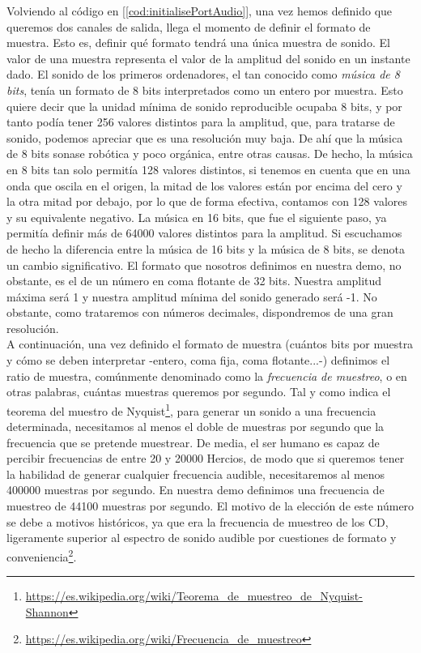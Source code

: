 Volviendo al código en [\ref{cod:initialisePortAudio}], una vez hemos definido que queremos dos canales de salida, llega el momento de definir el formato de muestra. Esto es, definir qué formato tendrá una única muestra de sonido. El valor de una muestra representa el valor de la amplitud del sonido en un instante dado. El sonido de los primeros ordenadores, el tan conocido como \emph{música de 8 bits}, tenía un formato de 8 bits interpretados como un entero por muestra. Esto quiere decir que la unidad mínima de sonido reproducible ocupaba 8 bits, y por tanto podía tener 256 valores distintos para la amplitud, que, para tratarse de sonido, podemos apreciar que es una resolución muy baja. De ahí que la música de 8 bits sonase robótica y poco orgánica, entre otras causas. De hecho, la música en 8 bits tan solo permitía 128 valores distintos, si tenemos en cuenta que en una onda que oscila en el origen, la mitad de los valores están por encima del cero y la otra mitad por debajo, por lo que de forma efectiva, contamos con 128 valores y su equivalente negativo. La música en 16 bits, que fue el siguiente paso, ya permitía definir más de 64000 valores distintos para la amplitud. Si escuchamos de hecho la diferencia entre la música de 16 bits y la música de 8 bits, se denota un cambio significativo. El formato que nosotros definimos en nuestra demo, no obstante, es el de un número en coma flotante de 32 bits. Nuestra amplitud máxima será 1 y nuestra amplitud mínima del sonido generado será -1. No obstante, como trataremos con números decimales, dispondremos de una gran resolución.\\

A continuación, una vez definido el formato de muestra (cuántos bits por muestra y cómo se deben interpretar -entero, coma fija, coma flotante...-) definimos el ratio de muestra, comúnmente denominado como la \emph{frecuencia de muestreo}, o en otras palabras, cuántas muestras queremos por segundo. Tal y como indica el teorema del muestro de Nyquist\footnote{\url{https://es.wikipedia.org/wiki/Teorema_de_muestreo_de_Nyquist-Shannon}}, para generar un sonido a una frecuencia determinada, necesitamos al menos el doble de muestras por segundo que la frecuencia que se pretende muestrear. De media, el ser humano es capaz de percibir frecuencias de entre 20 y 20000 Hercios, de modo que si queremos tener la habilidad de generar cualquier frecuencia audible, necesitaremos al menos 400000 muestras por segundo. En nuestra demo definimos una frecuencia de muestreo de 44100 muestras por segundo. El motivo de la elección de este número se debe a motivos históricos, ya que era la frecuencia de muestreo de los CD, ligeramente superior al espectro de sonido audible por cuestiones de formato y conveniencia\footnote{\url{https://es.wikipedia.org/wiki/Frecuencia_de_muestreo}}.\\

